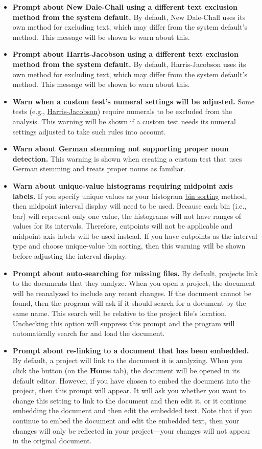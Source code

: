 \documentclass[
]{book}
\theoremstyle{definition}
\theoremstyle{definition}
\theoremstyle{definition}
\theoremstyle{definition}
\theoremstyle{remark}
\begin{document}
\begin{itemize}
\item
  \textbf{Prompt about New Dale-Chall using a different text exclusion method from the system default.} By default, New Dale-Chall uses its own method for excluding text, which may differ from the system default's method. This message will be shown to warn about this.
\item
  \textbf{Prompt about Harris-Jacobson using a different text exclusion method from the system default.} By default, Harris-Jacobson uses its own method for excluding text, which may differ from the system default's method. This message will be shown to warn about this.
\item
  \textbf{Warn when a custom test's numeral settings will be adjusted.} Some tests (e.g., \protect\hyperlink{harris-jacobson}{Harris-Jacobson}) require numerals to be excluded from the analysis. This warning will be shown if a custom test needs its numeral settings adjusted to take such rules into account.
\item
  \textbf{Warn about German stemming not supporting proper noun detection.} This warning is shown when creating a custom test that uses German stemming and treats proper nouns as familiar.
\item
  \textbf{Warn about unique-value histograms requiring midpoint axis labels.} If you specify unique values as your histogram \protect\hyperlink{options-histograms}{bin sorting} method, then midpoint interval display will need to be used. Because each bin (i.e., bar) will represent only one value, the histograms will not have ranges of values for its intervals. Therefore, cutpoints will not be applicable and midpoint axis labels will be used instead. If you have cutpoints as the interval type and choose unique-value bin sorting, then this warning will be shown before adjusting the interval display.
\item
  \textbf{Prompt about auto-searching for missing files.} By default, projects link to the documents that they analyze. When you open a project, the document will be reanalyzed to include any recent changes. If the document cannot be found, then the program will ask if it should search for a document by the same name. This search will be relative to the project file's location. Unchecking this option will suppress this prompt and the program will automatically search for and load the document.
\item
  \textbf{Prompt about re-linking to a document that has been embedded.} By default, a project will link to the document it is analyzing. When you click the  button (on the \textbf{Home} tab), the document will be opened in its default editor. However, if you have chosen to embed the document into the project, then this prompt will appear. It will ask you whether you want to change this setting to link to the document and then edit it, or it continue embedding the document and then edit the embedded text. Note that if you continue to embed the document and edit the embedded text, then your changes will only be reflected in your project---your changes will not appear in the original document.

\end{itemize}
\end{document}
